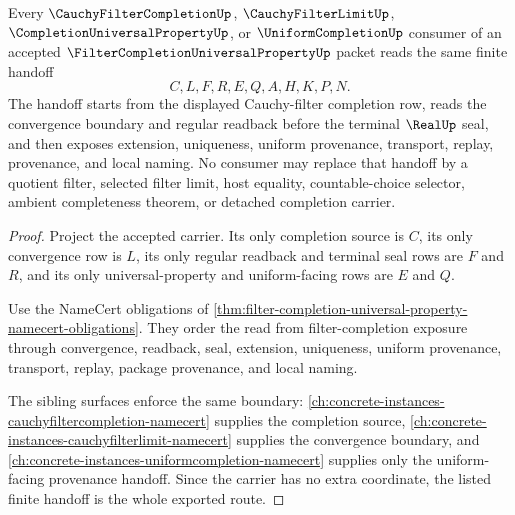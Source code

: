\begin{theorem}
\label{thm:filter-completion-universal-property-filter-handoff}
Every $\CauchyFilterCompletionUp$, $\CauchyFilterLimitUp$, $\CompletionUniversalPropertyUp$, or $\UniformCompletionUp$ consumer of an accepted $\FilterCompletionUniversalPropertyUp$ packet reads the same finite handoff
$$
C,L,F,R,E,Q,A,H,K,P,N .
$$
The handoff starts from the displayed Cauchy-filter completion row, reads the convergence boundary and regular readback before the terminal $\RealUp$ seal, and then exposes extension, uniqueness, uniform provenance, transport, replay, provenance, and local naming. No consumer may replace that handoff by a quotient filter, selected filter limit, host equality, countable-choice selector, ambient completeness theorem, or detached completion carrier.
\end{theorem}
\begin{proof}
Project the accepted carrier. Its only completion source is $C$, its only convergence row is $L$, its only regular readback and terminal seal rows are $F$ and $R$, and its only universal-property and uniform-facing rows are $E$ and $Q$.

Use the NameCert obligations of \autoref{thm:filter-completion-universal-property-namecert-obligations}. They order the read from filter-completion exposure through convergence, readback, seal, extension, uniqueness, uniform provenance, transport, replay, package provenance, and local naming.

The sibling surfaces enforce the same boundary: \autoref{ch:concrete-instances-cauchyfiltercompletion-namecert} supplies the completion source, \autoref{ch:concrete-instances-cauchyfilterlimit-namecert} supplies the convergence boundary, and \autoref{ch:concrete-instances-uniformcompletion-namecert} supplies only the uniform-facing provenance handoff. Since the carrier has no extra coordinate, the listed finite handoff is the whole exported route.
\end{proof}


